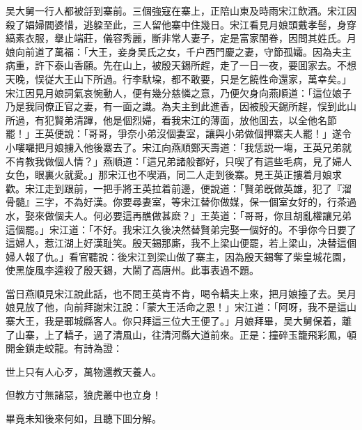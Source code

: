 吴大舅一行人都被㧱到寨前。三個強寇在寨上，正陪山東及時雨宋江飲酒。宋江因殺了娼婦閻婆惜，逃躱至此，三人留他寨中住幾日。宋江看見月娘頭戴孝髻，身穿縞素衣服，擧止端莊，儀容秀麗，斷非常人妻子，定是富家閨眷，因問其姓氏。月娘向前道了萬福：「大王，妾身吴氏之女，千户西門慶之妻，守節孤孀。因為夫主病重，許下泰山香願。先在山上，被殷天錫所趕，走了一日一夜，要囬家去。不想天晚，悮従大王山下所過。行李馱垜，都不敢要，只是乞饒性命還家，萬幸矣。」宋江因見月娘詞氣哀惋動人，便有幾分慈憐之意，乃便欠身向燕順道：「這位娘子乃是我同僚正官之妻，有一面之識。為夫主到此進香，因被殷天錫所趕，悮到此山所過，有犯賢弟清蹕，他是個烈婦，看我宋江的薄面，放他囬去，以全他名節罷！」王英便說：「哥哥，爭奈小弟沒個妻室，讓與小弟做個押寨夫人罷！」遂令小嘍囉把月娘擄入他後寨去了。宋江向燕順鄭天壽道：「我恁説一塲，王英兄弟就不肯教我做個人情？」燕順道：「這兄弟諸般都好，只喫了有這些毛病，見了婦人女色，眼裏火就愛。」那宋江也不喫酒，同二人走到後寨。見王英正摟着月娘求歡。宋江走到跟前，一把手將王英拉着前邊，便說道：「賢弟旣做英雄，犯了『溜骨髓』三字，不為好漢。你要尋妻室，等宋江替你做媒，保一個室女好的，行茶過水，娶來做個夫人。何必要這再醮做甚麽？」王英道：「哥哥，你且胡亂權讓兄弟這個罷。」宋江道：「不好。我宋江久後决然替賢弟完娶一個好的。不爭你今日要了這婦人，惹江湖上好漢耻笑。殷天錫那廝，我不上梁山便罷，若上梁山，决替這個婦人報了仇。」看官聽說：後宋江到梁山做了寨主，因為殷天錫奪了柴皇城花園，使黑旋風李逵殺了殷天錫，大鬧了高唐州。此事表過不題。

當日燕順見宋江說此話，也不問王英肯不肯，喝令轎夫上來，把月娘擡了去。吴月娘見放了他，向前拜謝宋江說：「蒙大王活命之恩！」宋江道：「阿呀，我不是這山寨大王，我是鄆城縣客人。你只拜這三位大王便了。」月娘拜畢，吴大舅保着，離了山寨，上了轎子，過了清風山，往清河縣大道前來。正是：撞碎玉籠飛彩鳳，頓開金鎖走蛟龍。有詩為證：

\begin{myquote}
世上只有人心歹，萬物還教天養人。

但教方寸無諸惡，狼虎叢中也立身！
\end{myquote}

畢竟未知後來何如，且聽下囬分解。

